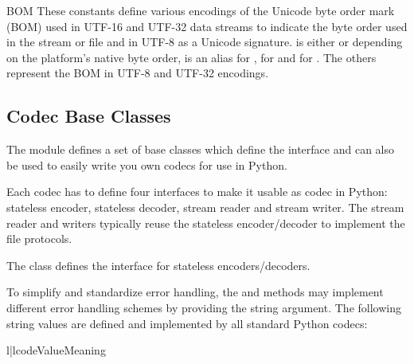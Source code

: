 \begin{datadesc}{BOM}
These constants define various encodings of the Unicode byte order mark
(BOM) used in UTF-16 and UTF-32 data streams to indicate the byte order
used in the stream or file and in UTF-8 as a Unicode signature.
 is either  or
 depending on the platform's native byte order,
 is an alias for , 
for  and  for .
The others represent the BOM in UTF-8 and UTF-32 encodings.
\end{datadesc}


\subsection{Codec Base Classes \label{codec-base-classes}}

The  module defines a set of base classes which define the
interface and can also be used to easily write you own codecs for use
in Python.

Each codec has to define four interfaces to make it usable as codec in
Python: stateless encoder, stateless decoder, stream reader and stream
writer. The stream reader and writers typically reuse the stateless
encoder/decoder to implement the file protocols.

The  class defines the interface for stateless
encoders/decoders.

To simplify and standardize error handling, the  and
 methods may implement different error handling
schemes by providing the  string argument.  The following
string values are defined and implemented by all standard Python
codecs:

\begin{tableii}{l|l}{code}{Value}{Meaning}
\end{tableii}

